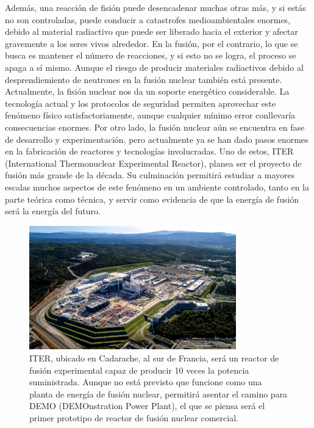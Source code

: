\documentclass[../main.tex]{subfiles}
\begin{document}
Además, una reacción de fisión puede desencadenar muchas otras más, y si estás no son controladas, puede conducir a catastrofes medioambientales enormes, debido al material radiactivo que puede ser liberado hacia el exterior y afectar gravemente a los seres vivos alrededor. En la fusión, por el contrario, lo que se busca es mantener el número de reacciones, y si esto no se logra, el proceso se apaga a sí mismo. Aunque el riesgo de producir materiales radiactivos debido al desprendiemiento de neutrones en la fusión nuclear también está presente. Actualmente, la fisión nuclear nos da un soporte energético considerable. La tecnología actual y los protocolos de seguridad permiten aprovechar este fenómeno físico satisfactoriamente, aunque cualquier mínimo error conllevaría consecuencias enormes. Por otro lado, la fusión nuclear aún se encuentra en fase de desarrollo y experimentación, pero actualmente ya se han dado pasos enormes en la fabricación de reactores y tecnologías involucradas. Uno de estos, ITER (International Thermonuclear Experimental Reactor), planea ser el proyecto de fusión más grande de la década. Su culminación permitirá estudiar a mayores escalas muchos aspectos de este fenómeno en un ambiente controlado, tanto en la parte teórica como técnica, y servir como evidencia de que la energía de fusión será la energía del futuro. \\

\begin{figure}[h] 
        \label{fig:figura2.1}
        \centering
        \includegraphics[width=0.8\textwidth]{Images/ITER.jpg}
        \caption{ITER, ubicado en Cadarache, al sur de Francia, será un reactor de fusión experimental capaz de producir 10 veces la potencia suministrada. Aunque no está previsto que funcione como una planta de energía de fusión nuclear, permitirá asentar el camino para DEMO (DEMOnstration Power Plant), el que se piensa será el primer prototipo de reactor de fusión nuclear comercial.}
\end{figure}
\end{document}
